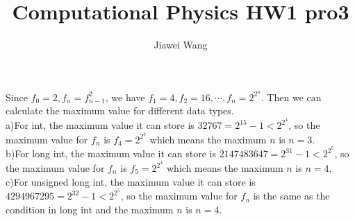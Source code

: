 \documentclass[a4paper,12pt]{article}
\begin{document}
\title{Computational Physics HW1 pro3}
\author{Jiawei Wang}
\date{}
\maketitle

\noindent Since $f_0=2, f_n=f_{n-1}^2$, we have $f_1=4, f_2=16, \cdots, f_n=2^{2^n}$. Then we can calculate the maximum value for different data types.\\
a)For int, the maximum value it can store is $32767=2^15-1<2^{2^4}$, so the maximum value for $f_n$ is $f_4=2^{2^3}$ which means the maximum $n$ is $n=3$.\\
b)For long int, the maximum value it can store is $2147483647=2^31-1<2^{2^5}$, so the maximum value for $f_n$ is $f_5=2^{2^4}$ which means the maximum $n$ is $n=4$.\\
c)For unsigned long int, the maximum value it can store is $4294967295=2^32-1<2^{2^5}$, so the maximum value for $f_n$ is the same as the condition in long int and the maximum $n$ is $n=4$.
\end{document}

